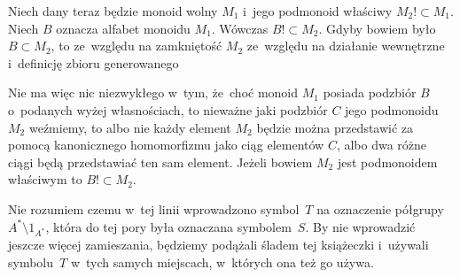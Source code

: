 \documentclass[a4paper,11pt]{article}
\begin{document}
Niech dany teraz będzie monoid wolny $M_{ 1 }$ i~jego podmonoid właściwy
$M_{ 2 } !\subset M_{ 1 }$. Niech $B$ oznacza alfabet monoidu $M_{ 1 }$. Wówczas $B !\subset M_{ 2 }$. Gdyby bowiem było $B \subset M_{ 2 }$, to ze~względu na zamkniętość $M_{ 2 }$ ze~względu na działanie wewnętrzne i~definicję zbioru generowanego

Nie ma więc nic niezwykłego w~tym, że~choć monoid $M_{ 1 }$ posiada podzbiór
$B$ o~podanych wyżej własnościach, to nieważne jaki podzbiór $C$ jego
podmonoidu $M_{ 2 }$ weźmiemy, to albo nie każdy element $M_{ 2 }$ będzie
można przedstawić za pomocą kanonicznego homomorfizmu jako ciąg elementów
$C$, albo dwa różne ciągi będą przedstawiać ten sam element. Jeżeli bowiem $M_{ 2 }$ jest podmonoidem właściwym to $B !\subset M_{ 2 }$.



\vspace{\spaceFour}





\start {} Nie rozumiem czemu w~tej linii wprowadzono symbol~$T$
na oznaczenie półgrupy $A^{ * } \setminus 1_{ A^{ * } }$, która do tej pory była
oznaczana symbolem~$S$. By nie wprowadzić jeszcze więcej zamieszania,
będziemy podążali śladem tej książeczki i~używali symbolu~$T$ w~tych samych
miejscach, w~których ona też go używa.

\vspace{\spaceFour}





\newpage

\end{document}

